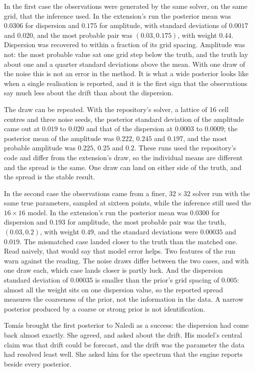 In the first case the observations were generated by the same solver, on the same grid,
that the inference used. In the extension's run the posterior mean was $0.0306$ for dispersion and $0.175$ for amplitude, with standard deviations of $0.0017$ and $0.020$, and the most probable pair was
$(0.03,0.175)$, with weight $0.44$. Dispersion was recovered to within a fraction of its grid
spacing. Amplitude was not: the most probable value sat one grid step below the truth, and
the truth lay about one and a quarter standard deviations above the mean. With one draw
of the noise this is not an error in the method. It is what a wide posterior looks like when
a single realisation is reported, and it is the first sign that the observations say much less
about the drift than about the dispersion.

The draw can be repeated. With the repository's solver, a lattice of 16 cell centres and three noise seeds, the posterior standard deviation of the amplitude came out at $0.019$ to $0.020$ and that of the dispersion at $0.0003$ to $0.0009$; the posterior mean of the amplitude was $0.222$, $0.245$ and $0.197$, and the most probable amplitude was $0.225$, $0.25$ and $0.2$. These runs used the repository's code and differ from the extension's draw, so the individual means are different and the spread is the same. One draw can land on either side of the truth, and the spread is the stable result.

In the second case the observations came from a finer, $32\times32$ solver run with the same
true parameters, sampled at sixteen points, while the inference still used the $16\times16$ model.
In the extension's run the posterior mean was $0.0300$ for dispersion and $0.193$ for amplitude, the most probable
pair was the truth, $(0.03,0.2)$, with weight $0.49$, and the standard deviations were $0.00035$
and $0.019$. The mismatched case landed closer to the truth than the matched one. Read
naively, that would say that model error helps. Two features of the run warn against the
reading. The noise draws differ between the two cases, and with one draw each, which case
lands closer is partly luck. And the dispersion standard deviation of $0.00035$ is smaller than
the prior's grid spacing of $0.005$: almost all the weight sits on one dispersion value, so the
reported spread measures the coarseness of the prior, not the information in the data. A
narrow posterior produced by a coarse or strong prior is not identification.

Tom\'as brought the first posterior to Naledi as a success: the dispersion had come back
almost exactly. She agreed, and asked about the drift. His model's central claim was that
drift could be forecast, and the drift was the parameter the data had resolved least well. She
asked him for the spectrum that the engine reports beside every posterior.

